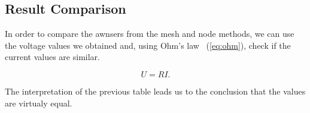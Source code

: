 \subsection{Result Comparison }

In order to compare the awnsers from the mesh and node methods, we
can use the voltage values we obtained and, using Ohm's law ~(\ref{eq:ohm}), check if the
current values are similar.

\vspace{0.5cm}

\begin{equation}
  U = RI.
  \label{eq:ohm}
\end{equation}

\vspace{0.5cm}


\vspace{0.5cm}

The interpretation of the previous table leads us to the conclusion that the
values are virtualy equal.

\vspace{0.5cm}
